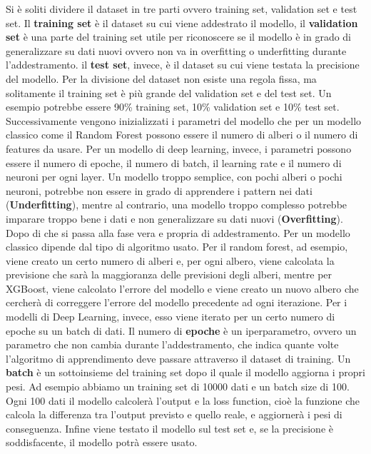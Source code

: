 \documentclass[12pt,a4paper,openright,twoside]{book}
\begin{document}
\noindent Si è soliti dividere il dataset in tre parti ovvero training set, validation set e test set.
Il \textbf{training set} è il dataset su cui viene addestrato
il modello, il \textbf{validation set} è una parte del training set
utile per riconoscere se il modello è in grado di generalizzare
su dati nuovi ovvero non va in overfitting o underfitting durante l'addestramento.
il \textbf{test set}, invece, è il dataset
su cui viene testata la precisione del modello.
Per la divisione del dataset non esiste una regola fissa,
ma solitamente il training set è più grande del validation set
e del test set. Un esempio potrebbe essere 90\% training set, 10\% validation set
e 10\% test set.
Successivamente vengono inizializzati i parametri del modello
che per un modello classico come il Random Forest
possono essere il numero di alberi o il numero di features da usare.
Per un modello di deep learning, invece, i parametri possono essere
il numero di epoche, il numero di batch, il learning rate e il numero di neuroni per ogni layer.
Un modello troppo semplice, con pochi alberi o pochi neuroni,
potrebbe non essere in grado di apprendere i pattern
nei dati (\textbf{Underfitting}), mentre al contrario,
una modello troppo complesso potrebbe imparare
troppo bene i dati e non generalizzare su dati nuovi
(\textbf{Overfitting}).
Dopo di che si passa alla fase vera e propria di addestramento.
Per un modello classico dipende dal tipo di algoritmo usato.
Per il random forest, ad esempio, viene creato un certo numero di alberi
e, per ogni albero, viene calcolata la previsione
che sarà la maggioranza delle previsioni degli alberi,
mentre per XGBoost,
viene calcolato l'errore del modello e viene creato un nuovo albero
che cercherà di correggere l'errore del modello precedente ad ogni iterazione.
Per i modelli di Deep Learning, invece, esso viene iterato per un certo numero di epoche su un batch di dati.
Il numero di \textbf{epoche} è un iperparametro, ovvero un parametro che non cambia durante l'addestramento, che indica quante volte
l'algoritmo di apprendimento deve passare attraverso il dataset di training\cite{brownlee2018difference}.
Un \textbf{batch} è un sottoinsieme del training set dopo il quale il modello
aggiorna i propri pesi. Ad esempio abbiamo un training set di 10000 dati
e un batch size di 100. Ogni 100 dati il modello calcolerà
l'output e la loss function, cioè la funzione che calcola
la differenza tra l'output previsto e quello reale, e aggiornerà i pesi di conseguenza.
Infine viene testato il modello sul test set e, se la precisione
è soddisfacente, il modello potrà essere usato.
\end{document}

